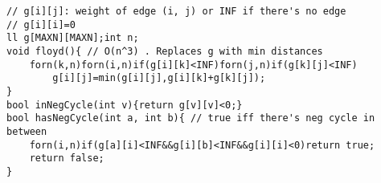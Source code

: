 \begin{verbatim}
// g[i][j]: weight of edge (i, j) or INF if there's no edge
// g[i][i]=0
ll g[MAXN][MAXN];int n;
void floyd(){ // O(n^3) . Replaces g with min distances
	forn(k,n)forn(i,n)if(g[i][k]<INF)forn(j,n)if(g[k][j]<INF)
		g[i][j]=min(g[i][j],g[i][k]+g[k][j]);
}
bool inNegCycle(int v){return g[v][v]<0;}
bool hasNegCycle(int a, int b){ // true iff there's neg cycle in between
	forn(i,n)if(g[a][i]<INF&&g[i][b]<INF&&g[i][i]<0)return true;
	return false;
}
\end{verbatim}
